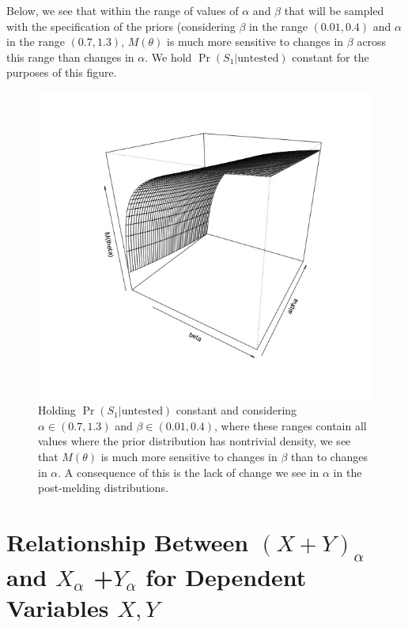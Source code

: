 \documentclass[12pt,twoside]{smiththesis}
\begin{document}
Below, we see that within the range of values of \(\alpha\) and \(\beta\) that will be sampled with the specification of the priors (considering \(\beta\) in the range \((0.01,0.4)\) and \(\alpha\) in the range \((0.7,1.3)\), \(M(\theta)\) is much more sensitive to changes in \(\beta\) across this range than changes in \(\alpha\). We hold \(\Pr(S_1|\text{untested})\) constant for the purposes of this figure.
\begin{figure}

{\centering \includegraphics[width=1\linewidth]{../presentation/figure/alpha_little_change} 

}

\caption{\label{fig:alpha-little-change}Holding $\Pr(S_1|\text{untested})$ constant and considering $\alpha \in (0.7,1.3)$ and $\beta \in (0.01,0.4)$, where these ranges contain all values where the prior distribution has nontrivial density, we see that $M(\theta)$ is much more sensitive to changes in $\beta$ than to changes in $\alpha$. A consequence of this is the lack of change we see in $\alpha$ in the post-melding distributions.}\label{fig:unnamed-chunk-117}
\end{figure}
\hypertarget{conservativeintervals}{%
\section{\texorpdfstring{Relationship Between \((X+Y)_\alpha\) and \(X_{\alpha}\) +\(Y_{\alpha}\) for Dependent Variables \(X,Y\)}{Relationship Between (X+Y)\_\textbackslash alpha and X\_\{\textbackslash alpha\} +Y\_\{\textbackslash alpha\} for Dependent Variables X,Y}}\label{conservativeintervals}}
\end{document}
